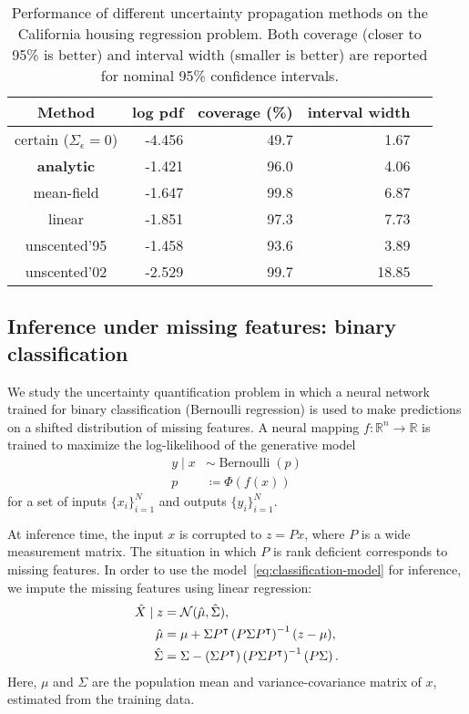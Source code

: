 \documentclass{article}
\begin{document}
\begin{table}
  \begin{center}
    \begin{tabular}{crrrr}
      \toprule
      Method & log pdf & coverage (\%) & interval width \\
      \midrule
      certain (\(\Sigma_\epsilon = 0\)) & -4.456 & 49.7 & 1.67 \\
      \midrule
      {\bfseries analytic} & -1.421 & 96.0 & 4.06 \\
      mean-field & -1.647 & 99.8 & 6.87 \\
      linear & -1.851 & 97.3 & 7.73 \\
      unscented'95 & -1.458 & 93.6 & 3.89 \\
      unscented'02 & -2.529 & 99.7 & 18.85 \\
      \bottomrule
    \end{tabular}
  \end{center}
  \caption{\label{tab:california-housing} Performance of different uncertainty propagation methods on the California housing regression problem. Both coverage (closer to 95\% is better) and interval width (smaller is better) are reported for nominal 95\% confidence intervals.}
\end{table}

\subsection{Inference under missing features: binary classification}
\label{sec:classification}
We study the uncertainty quantification problem in which a neural network trained for binary classification (Bernoulli regression) is used to make predictions on a shifted distribution of missing features.
A neural mapping \(f: \mathbb R ^{n} \to \mathbb R\) is trained to maximize the log-likelihood of the generative model
\begin{align}
\label{eq:classification-model}
  y \mid x &\sim \operatorname{Bernoulli}(p)
  \\
  p &\coloneqq \Phi(f(x))
\end{align}
for a set of inputs \(\{x_i\}_{i=1}^N\) and outputs \(\{y_i\}_{i=1}^N\).

At inference time, the input \(x\) is corrupted to \(z = Px\), where \(P\) is a wide measurement matrix.
The situation in which \(P\) is rank deficient corresponds to missing features.
In order to use the model~\eqref{eq:classification-model} for inference, we impute the missing features using linear regression:
\begin{subequations}
\label{eq:classification-imputation}
\begin{align}
  \hat X \mid z
  &= \mathcal N(\hat \mu, \hat \Sigma),\\
  \hat \mu
  &= \mu + \Sigma P^\intercal \del{P \Sigma P^\intercal}^{-1} (z - \mu),\\
  \hat \Sigma
  &= \Sigma - \del{\Sigma P^\intercal} \del{P \Sigma P^\intercal}^{-1} \del{P \Sigma}.
\end{align}
\end{subequations}
Here, \(\mu\) and \(\Sigma\) are the population mean and variance-covariance matrix of \(x\), estimated from the training data.
\end{document}

